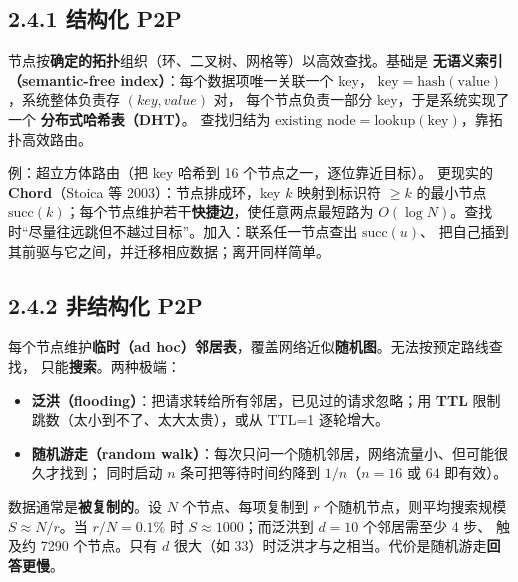 \subsection*{2.4.1 结构化 P2P}
节点按\textbf{确定的拓扑}组织（环、二叉树、网格等）以高效查找。基础是
\textbf{无语义索引（semantic-free index）}：每个数据项唯一关联一个 key，
$\text{key} = \text{hash}(\text{value})$，系统整体负责存 $(key,value)$ 对，
每个节点负责一部分 key，于是系统实现了一个 \textbf{分布式哈希表（DHT）}。
查找归结为 $\text{existing node} = \text{lookup}(\text{key})$，靠拓扑高效路由。

\begin{closeread}
\end{closeread}

\noindent 例：超立方体路由（把 key 哈希到 16 个节点之一，逐位靠近目标）。
更现实的\textbf{Chord}（Stoica 等 2003）：节点排成环，key $k$ 映射到标识符
$\ge k$ 的最小节点 $\text{succ}(k)$；每个节点维护若干\textbf{快捷边}，使任意两点最短路为
$O(\log N)$。查找时“尽量往远跳但不越过目标”。加入：联系任一节点查出 $\text{succ}(u)$、
把自己插到其前驱与它之间，并迁移相应数据；离开同样简单。

\subsection*{2.4.2 非结构化 P2P}
每个节点维护\textbf{临时（ad hoc）邻居表}，覆盖网络近似\textbf{随机图}。无法按预定路线查找，
只能\textbf{搜索}。两种极端：

\begin{itemize}
  \item \textbf{泛洪（flooding）}：把请求转给所有邻居，已见过的请求忽略；用 \textbf{TTL}
        限制跳数（太小到不了、太大太贵），或从 TTL=1 逐轮增大。
  \item \textbf{随机游走（random walk）}：每次只问一个随机邻居，网络流量小、但可能很久才找到；
        同时启动 $n$ 条可把等待时间约降到 $1/n$（$n=16$ 或 $64$ 即有效）。
\end{itemize}

\begin{ideabox}
数据通常是\textbf{被复制的}。设 $N$ 个节点、每项复制到 $r$ 个随机节点，则平均搜索规模
$S \approx N/r$。当 $r/N = 0.1\%$ 时 $S\approx 1000$；而泛洪到 $d=10$ 个邻居需至少 4 步、
触及约 7290 个节点。只有 $d$ 很大（如 33）时泛洪才与之相当。代价是随机游走\textbf{回答更慢}。
\end{ideabox}

